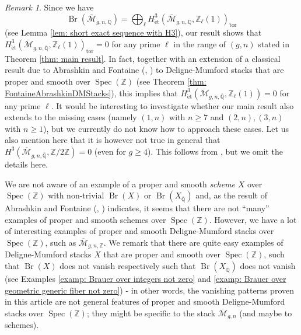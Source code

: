 \documentclass{amsart}
\theoremstyle{definition}
\theoremstyle{remark}
\newtheorem{remark}[prop]{Remark}
\DeclareMathOperator{\Spec}{Spec}
\DeclareMathOperator{\Br}{Br}
\newcommand{\Q}{\mathbb{Q}}
\newcommand{\ZZ}{\mathbb Z}
\newcommand{\et}{\operatorname{\acute{e}t}}%
\begin{document}
\begin{remark}\label{Remark:torsion and torsion coefficients}
Since we have
    \[
    \Br(\overline{\mathcal{M}}_{g,n,\overline{\mathbb{Q}}}) = \bigoplus_{\ell} H^3_{\et}(\overline{\mathcal{M}}_{g,n,\overline{\mathbb{Q}}}, \ZZ_\ell(1))_{\mathrm{tor}}
    \]
    (see Lemma \ref{lem: short exact sequence with H3}),
    our result shows that $H^3_{\et}(\overline{\mathcal{M}}_{g,n,\overline{\mathbb{Q}}}, \ZZ_\ell(1))_{\mathrm{tor}}=0$ for any prime $\ell$ in the range of $(g,n)$ stated in Theorem \ref{thm: main result}.
    In fact, together with an extension of a classical result due to Abrashkin and Fontaine (\cite{Abrashkin90}, \cite{FontainePropreLisseZ}) to Deligne-Mumford stacks that are proper and smooth over $\Spec(\ZZ)$ (see Theorem \ref{thm: FontaineAbrashkinDMStacks}),
    this implies that $H^3_{\et}(\overline{\mathcal{M}}_{g,n,\overline{\mathbb{Q}}}, \ZZ_\ell(1))=0$ for any prime $\ell$.
    It would be interesting to investigate whether our main result also extends to the missing cases
    (namely $(1,n)$ with $n\geq 7$ and $(2,n),(3,n)$ with $n\geq 1$), but we currently do not know how to approach these cases.
    Let us also mention here that it is however not true in general that
    $
        H^{3}(\overline{\mathcal{M}}_{g,n,\overline{\mathbb{Q}}},\mathbb{Z}/2\mathbb{Z})=0
    $
    (even for $g \geq 4$).
    This follows from \cite[Theorem 1.2]{EbertGiansiracusaTorsionClass}, but we omit the details here.
\end{remark}


We are not aware of an example of a proper and smooth \textit{scheme} $X$ over $\Spec (\ZZ)$ with non-trivial $\Br(X)$ or $\Br(X_{\overline{\Q}})$ and, as the result of Abrashkin and Fontaine (\cite{Abrashkin90}, \cite{FontainePropreLisseZ}) indicates,
it seems that there are not ``many'' examples of proper and smooth schemes over $\Spec (\ZZ)$.
However,
we have a lot of interesting examples of proper and smooth Deligne-Mumford stacks over $\Spec (\ZZ)$, such as $\overline{\mathcal{M}}_{g,n,\ZZ}$.
We remark that there are quite easy examples of Deligne-Mumford stacks $X$ that are proper and smooth over $\Spec (\ZZ)$, such that
$\Br(X)$ does not vanish
respectively
such that $\Br(X_{\overline{\Q}})$ does not vanish (see Examples \ref{examp: Brauer over integers not zero} and \ref{examp: Brauer over geometric generic fiber not zero}) - in other words, the vanishing patterns proven in this article are not general features of proper and smooth Deligne-Mumford stacks over $\Spec (\ZZ)$; they might be specific to the stack $\overline{\mathcal{M}}_{g,n}$ (and maybe to schemes).
\end{document}
